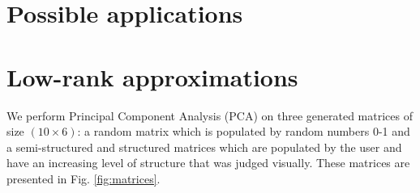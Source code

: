 \documentclass[10pt,twocolumn]{article}
\begin{document}
\section{Possible applications}


\newpage

\section{Low-rank approximations}

We perform Principal Component Analysis (PCA) on three generated matrices of size $(10 \times 6)$: a random matrix which is populated by random numbers 0-1 and a semi-structured and structured matrices which are populated by the user and have an increasing level of structure that was judged visually. These matrices are presented in Fig. \ref{fig:matrices}.
\end{document}
